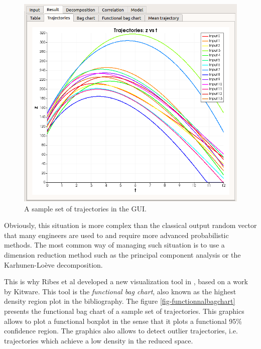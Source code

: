 \documentclass{article}
\begin{document}
\begin{figure}
\centering
\includegraphics[width=\textwidth]{figures/central_tendency_trajectories-focus.png}
\caption{A sample set of trajectories in the GUI.}
\label{fig-trajectories}
\end{figure}

Obviously, this situation is more complex than the classical output random 
vector that many engineers are used to and require more advanced 
probabilistic methods. 
The most common way of managing such situation is to use a 
dimension reduction method such as the principal component analysis or the 
Karhunen-Loève decomposition. 

This is why Ribes et al \cite{Ribes2014} developed a new visualization tool in \cite{PVurl}, based on a 
work by Kitware. 
This tool is the \emph{functional bag chart}, also known as the highest density region 
plot in the bibliography. 
The figure \ref{fig-functionnalbagchart} presents the functional bag chart of a sample 
set of trajectories. 
This graphics allows to plot a functional boxplot in the sense that it plots a functional 95\% confidence 
region. 
The graphics also allows to detect outlier trajectories, i.e. trajectories which achieve a low 
density in the reduced space. 
\end{document}
